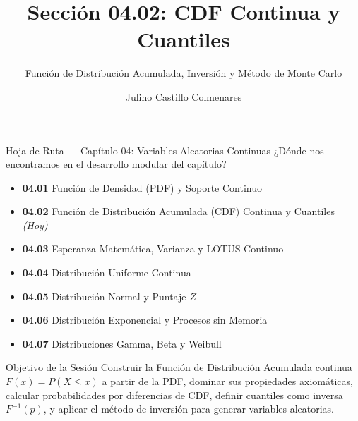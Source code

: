 \documentclass[10pt, aspectratio=169]{beamer}
\title[CDF Continua y Cuantiles]{Sección 04.02: CDF Continua y Cuantiles}
\subtitle{Función de Distribución Acumulada, Inversión y Método de Monte Carlo}
\author[J. Castillo Colmenares]{Juliho Castillo Colmenares}
\institute{Tecnológico de Monterrey}
\date{\vspace{-1.2cm}}
\begin{document}
\begin{frame}[plain]
  \titlepage
\end{frame}

\begin{frame}{Hoja de Ruta --- Capítulo 04: Variables Aleatorias Continuas}
  \footnotesize
  ¿Dónde nos encontramos en el desarrollo modular del capítulo? \pause
  \begin{itemize}\itemsep=0.08em
    \item \textbf{04.01} Función de Densidad (PDF) y Soporte Continuo \pause
    \item \textbf{04.02} Función de Distribución Acumulada (CDF) Continua y Cuantiles \emph{(Hoy)} \pause
    \item \textbf{04.03} Esperanza Matemática, Varianza y LOTUS Continuo \pause
    \item \textbf{04.04} Distribución Uniforme Continua \pause
    \item \textbf{04.05} Distribución Normal y Puntaje $Z$ \pause
    \item \textbf{04.06} Distribución Exponencial y Procesos sin Memoria \pause
    \item \textbf{04.07} Distribuciones Gamma, Beta y Weibull
  \end{itemize}
  \vspace{-0.05cm}
  \begin{block}{Objetivo de la Sesión}
    Construir la Función de Distribución Acumulada continua $F(x) = P(X \le x)$ a partir de la PDF, dominar sus propiedades axiomáticas, calcular probabilidades por diferencias de CDF, definir cuantiles como inversa $F^{-1}(p)$, y aplicar el método de inversión para generar variables aleatorias.
  \end{block}
\end{frame}
\end{document}
